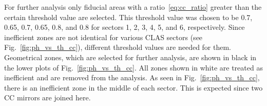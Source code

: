 

For further analysis only fiducial areas with a ratio~\eqref{eq:cc_ratio} greater than the certain threshold value are selected. This threshold value was chosen to be 0.7, 0.65, 0.7, 0.65, 0.8, and 0.8 for sectors 1, 2, 3, 4, 5, and 6, respectively. Since inefficient zones are not identical for various CLAS sectors (see Fig.~\ref{fig:ph_vs_th_cc}), different threshold values are needed for them. Geometrical zones, which are selected for further analysis, are shown in black in the lower plots of Fig.~\ref{fig:ph_vs_th_cc}. All zones shown in white are treated as inefficient and are removed from the analysis. As seen in Fig.~\ref{fig:ph_vs_th_cc}, there is an inefficient zone in the middle of each sector. This is expected since two CC mirrors are joined here. 

